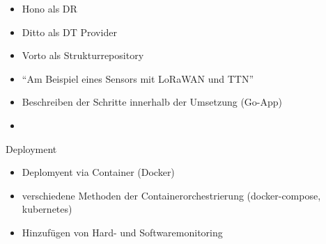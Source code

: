 \begin{itemize}
    \item Hono als DR
    \item Ditto als DT Provider
    \item Vorto als Strukturrepository
    \item \enquote{Am Beispiel eines Sensors mit LoRaWAN und TTN}
    \item Beschreiben der Schritte innerhalb der Umsetzung (Go-App)
    \item 
\end{itemize}

\large{Deployment}
\normalsize
\begin{itemize}
    \item Deplomyent via Container (Docker)
    \item verschiedene Methoden der Containerorchestrierung (docker-compose, kubernetes)
    \item Hinzufügen von Hard- und Softwaremonitoring
\end{itemize}
